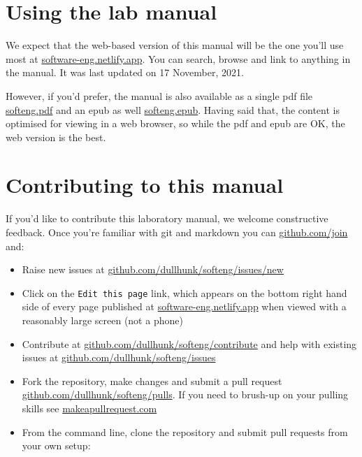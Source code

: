 \documentclass[
]{book}
\providecommand{\tightlist}{%
  \setlength{\itemsep}{0pt}\setlength{\parskip}{0pt}}
\begin{document}
\hypertarget{usingit}{%
\section{Using the lab manual}\label{usingit}}

We expect that the web-based version of this manual will be the one you'll use most at \href{https://software-eng.netlify.app/}{software-eng.netlify.app}. You can search, browse and link to anything in the manual. It was last updated on 17 November, 2021.

However, if you'd prefer, the manual is also available as a single pdf file \href{https://software-eng.netlify.app/softeng.pdf}{softeng.pdf} and an epub as well \href{https://software-eng.netlify.app/softeng.epub}{softeng.epub}. Having said that, the content is optimised for viewing in a web browser, so while the pdf and epub are OK, the web version is the best.

\hypertarget{contributing}{%
\section{Contributing to this manual}\label{contributing}}

If you'd like to contribute this laboratory manual, we welcome constructive feedback. Once you're familiar with git and markdown you can \href{https://github.com/join}{github.com/join} and:

\begin{itemize}
\tightlist
\item
  Raise new issues at \href{https://github.com/dullhunk/softeng/issues/new}{github.com/dullhunk/softeng/issues/new}
\item
  Click on the \texttt{Edit\ this\ page} link, which appears on the bottom right hand side of every page published at \href{https://software-eng.netlify.app}{software-eng.netlify.app} when viewed with a reasonably large screen (not a phone)
\item
  Contribute at \href{https://github.com/dullhunk/softeng/contribute}{github.com/dullhunk/softeng/contribute} and help with existing issues at \href{https://github.com/dullhunk/softeng/issues}{github.com/dullhunk/softeng/issues}
\item
  Fork the repository, make changes and submit a pull request \href{https://github.com/dullhunk/softeng/pulls}{github.com/dullhunk/softeng/pulls}. If you need to brush-up on your pulling skills see \href{http://makeapullrequest.com/}{makeapullrequest.com}
\item
  From the command line, clone the repository and submit pull requests from your own setup:
\end{itemize}
\end{document}
